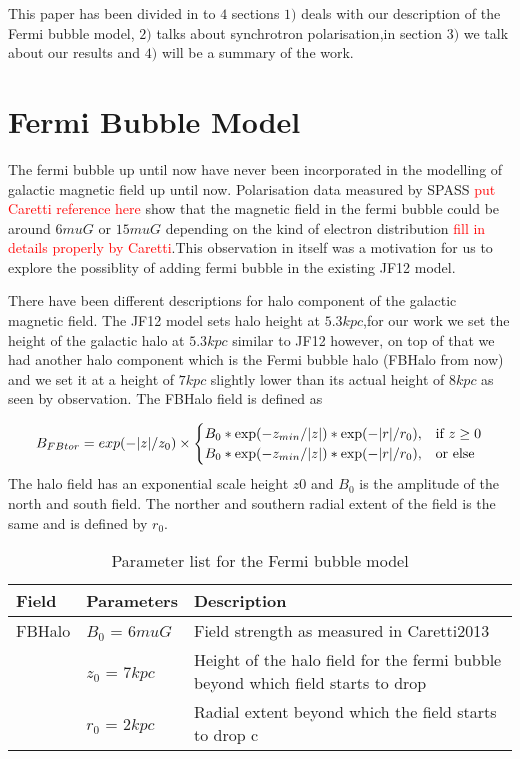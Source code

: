 \documentclass[12pt, a4 paper]{article}
\begin{document}
This paper has been divided in to $4$ sections $1)$ deals with our description of the Fermi bubble model, $2)$ talks about synchrotron polarisation,in section $3)$ we talk about our results and $4)$ will be a summary of the work.
\newpage
\section{Fermi Bubble Model}
The fermi bubble up until now have never been incorporated in the modelling of galactic magnetic field up until now. Polarisation data measured by SPASS \textcolor{red}{put Caretti reference here} show that the magnetic field in the fermi bubble could be around $6muG$ or $15muG$ depending on the kind of electron distribution \textcolor{red}{fill in details properly by Caretti}.This observation in itself was a motivation for us to explore the possiblity of adding fermi bubble in the existing JF12 model. 

There have been different descriptions for halo component of the galactic magnetic field. The JF12 model sets halo height at $5.3kpc$,for our work we set the height of the galactic halo at $5.3kpc$ similar to JF12 however, on top of that we had another halo component which is the Fermi bubble halo (FBHalo from now) and we set it at a height of $7kpc$ slightly lower than its actual height of $8kpc$ as seen by observation. The FBHalo field is defined as 



\[
     B_{FBtor}= exp(-\abs{z}/z_{0})\times 
\begin{cases}
    B_{0}* \exp(-z_{min}/\abs{z})*\exp(-\abs{r}/r_{0}),& \text{if } z\ge 0\\
    B_{0}* \exp(-z_{min}/\abs{z})*\exp(-\abs{r}/r_{0}),& \text{or else} 
\end{cases}
\]
The halo field has an exponential scale height $z{0}$ and $B_{0}$ is the amplitude of the north and south field. The norther and southern radial extent of the field is the same and is defined by $r_{0}$.
\begin{table}[h!]
  \begin{center}
    \caption{Parameter list for the Fermi bubble model}
    \label{tab:table1}
    
    \begin{tabular}{ |p{3cm}||p{3cm}|p{3cm}|} %
    \hline
      \textbf{Field} & \textbf{Parameters} & \textbf{Description}\\
      \hline
      FBHalo & $B_{0}$ = $6muG$ & Field strength as measured in Caretti2013\\
       & $z_{0}$ = $7kpc$ & Height of the halo field for the fermi bubble beyond which field starts to drop\\
       & $r_{0}$ = $2kpc$ & Radial extent beyond which the field starts to drop c\\
       \hline
    \end{tabular}
  \end{center}
\end{table}
\end{document}

